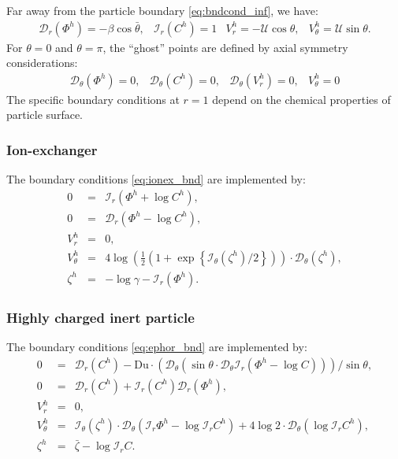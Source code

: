 \documentclass[MSc,beforeExam]{iitcsthesis}
\newcommand{\pars}[1]{\left(#1\right)}
\newcommand\Du{\text{Du}}
\newcommand\cI{\mathcal{I}}
\newcommand\cD{\mathcal{D}}
\newcommand\cU{\mathscr{U}}
\begin{document}
Far away from the particle boundary \eqref{eq:bndcond_inf}, we have:
\begin{equation}
\begin{array}{cccc}
\cD_r \pars{\varPhi^h} = -\beta \cos\bar{\theta}, &
\cI_r \pars{C^h} = 1 &
V_r^h = -\cU \cos\theta, &
V_\theta^h = \cU \sin\theta.
\end{array}\end{equation}
For $\theta = 0$ and $\theta = \pi$, the ``ghost'' points are defined by axial 
symmetry considerations:
\begin{equation} 
\begin{array}{cccc}
\cD_\theta \pars{\varPhi^h} = 0, &
\cD_\theta \pars{C^h} = 0, &
\cD_\theta \pars{V_r^h} = 0, &
V_\theta^h = 0
\end{array}
\end{equation}
The specific boundary conditions at $r=1$
depend on the chemical properties of particle surface.

\subsubsection{Ion-exchanger} The boundary conditions \eqref{eq:ionex_bnd} 
are implemented by:
\begin{equation}
\begin{array}{rcl}
0 &=& \cI_r(\varPhi^h + \log C^h), \\
0 &=& \cD_r(\varPhi^h - \log C^h), \\
V^h_r &=& 0, \\
V^h_\theta &=& 4\log\pars{\frac{1}{2}\pars{1 + \exp\left\{\cI_\theta(\zeta^h)/2\right\}}} \cdot 
			\cD_\theta(\zeta^h), \\
  \zeta^h &=& - \log \gamma - \cI_r(\varPhi^h).
\end{array}
\end{equation}

\subsubsection{Highly charged inert particle} The boundary conditions \eqref{eq:ephor_bnd} 
are implemented by:
\begin{equation}
\begin{array}{rcl}
0 &=& \cD_r(C^h) - \Du \cdot 
\pars{\cD_\theta \pars{\sin\theta \cdot \cD_\theta \cI_r\pars{\varPhi^h - \log C}}}/{\sin\theta}, \\
0 &=& \cD_r(C^h) + \cI_r(C^h) \cD_r(\varPhi^h), \\
V^h_r &=& 0, \\
V^h_\theta &=& \cI_\theta(\zeta^h) \cdot \cD_\theta(\cI_r \varPhi^h - \log \cI_r C^h) + 
4 \log 2 \cdot \cD_\theta(\log \cI_r C^h), \\
  \zeta^h &=& \bar{\zeta} - \log \cI_r C.
\end{array}
\end{equation}
\end{document}

